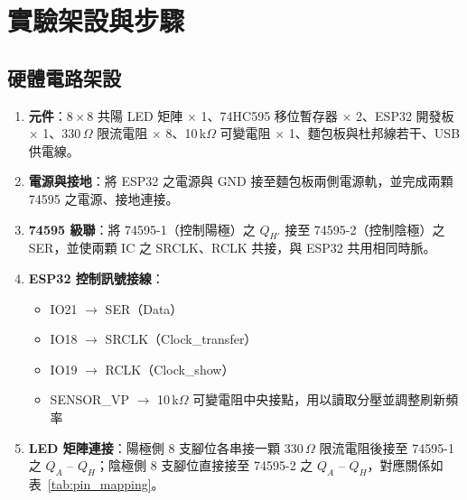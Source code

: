 \documentclass[12pt]{article}
\begin{document}
\section{實驗架設與步驟}

\subsection{硬體電路架設}

\begin{enumerate}
    \item \textbf{元件}：$8 \times 8$ 共陽 LED 矩陣 $\times$ 1、74HC595 移位暫存器 $\times$ 2、ESP32 開發板 $\times$ 1、330\,$\Omega$ 限流電阻 $\times$ 8、10\,k$\Omega$ 可變電阻 $\times$ 1、麵包板與杜邦線若干、USB 供電線。

    \item \textbf{電源與接地}：將 ESP32 之電源與 GND 接至麵包板兩側電源軌，並完成兩顆 74595 之電源、接地連接。

    \item \textbf{74595 級聯}：將 74595-1（控制陽極）之 $Q_{H'}$ 接至 74595-2（控制陰極）之 SER，並使兩顆 IC 之 SRCLK、RCLK 共接，與 ESP32 共用相同時脈。

    \item \textbf{ESP32 控制訊號接線}：
    \begin{itemize}
        \item IO21 $\rightarrow$ SER（Data）
        \item IO18 $\rightarrow$ SRCLK（Clock\_transfer）
        \item IO19 $\rightarrow$ RCLK（Clock\_show）
        \item SENSOR\_VP $\rightarrow$ 10\,k$\Omega$ 可變電阻中央接點，用以讀取分壓並調整刷新頻率
    \end{itemize}

    \item \textbf{LED 矩陣連接}：陽極側 8 支腳位各串接一顆 330\,$\Omega$ 限流電阻後接至 74595-1 之 $Q_A$ -- $Q_H$；陰極側 8 支腳位直接接至 74595-2 之 $Q_A$ -- $Q_H$，對應關係如表~\ref{tab:pin_mapping}。


\end{enumerate}
\end{document}
